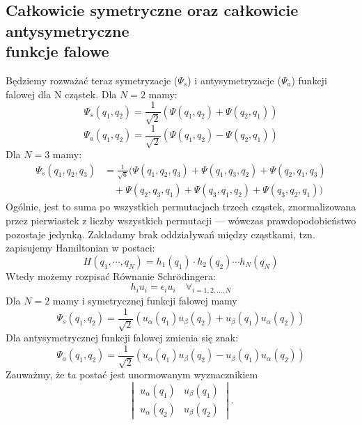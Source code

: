 \subsection{Całkowicie symetryczne oraz całkowicie antysymetryczne \texorpdfstring{\\}{} funkcje falowe}
%
Będziemy rozważać teraz symetryzacje ($\Psi_s$) i antysymetryzacje ($\Psi_a$)
funkcji falowej dla N cząstek.
Dla $N = 2$ mamy:
%
\begin{equation*}
    \Psi_s (q_1, q_2) = \frac{1}{\sqrt{2}} \left( \Psi(q_1, q_2) + \Psi(q_2, q_1) \right)
\end{equation*}
%
\begin{equation*}
    \Psi_a (q_1, q_2) = \frac{1}{\sqrt{2}} \left( \Psi(q_1, q_2) - \Psi(q_2, q_1) \right)
\end{equation*}
%
Dla $N = 3$ mamy:
%
\begin{align*}
    \Psi_s (q_1, q_2, q_3) &= \frac{1}{\sqrt{6}} \big( 
        \Psi(q_1, q_2, q_3) + \Psi(q_1, q_3, q_2) + \Psi(q_2, q_1, q_3) \\
        &\quad + \Psi(q_2, q_3, q_1) + \Psi(q_3, q_1, q_2) + \Psi(q_3, q_2, q_1)
    \big)
\end{align*}
%
Ogólnie, jest to suma po wszystkich permutacjach trzech cząstek, znormalizowana
przez pierwiastek z liczby wszystkich permutacji --- wówczas prawdopodobieństwo
pozostaje jedynką.
%
Zakładamy brak oddziaływań między cząstkami, tzn. zapisujemy Hamiltonian w postaci:
%
\begin{equation*}
    H(q_1, \cdots, q_N) = h_1(q_1) \cdot h_2(q_2) \cdots h_N(q_N)
\end{equation*}
%
Wtedy możemy rozpisać Równanie Schrödingera:
%
\begin{equation*}
    h_i u_i = \epsilon_i u_i \quad \forall_{i = 1, 2, \ldots, N}
\end{equation*}
%
Dla $N = 2$ mamy i symetrycznej funkcji falowej mamy
\begin{equation*}
    \Psi_s(q_1, q_2) = \frac{1}{\sqrt{2}} (u_\alpha(q_1) u_\beta(q_2) + u_\beta(q_1) u_\alpha(q_2))
\end{equation*}
%
Dla antysymetrycznej funkcji falowej zmienia się znak:
%
\begin{equation*}
    \Psi_a(q_1, q_2) = \frac{1}{\sqrt{2}} (u_\alpha(q_1) u_\beta(q_2) - u_\beta(q_1) u_\alpha(q_2))
\end{equation*}
Zauważmy, że ta postać jest unormowanym wyznacznikiem
\begin{equation*}
    \begin{vmatrix}
        u_\alpha(q_1) & u_\beta(q_1) \\
        u_\alpha(q_2) & u_\beta(q_2)
    \end{vmatrix}.
\end{equation*}

